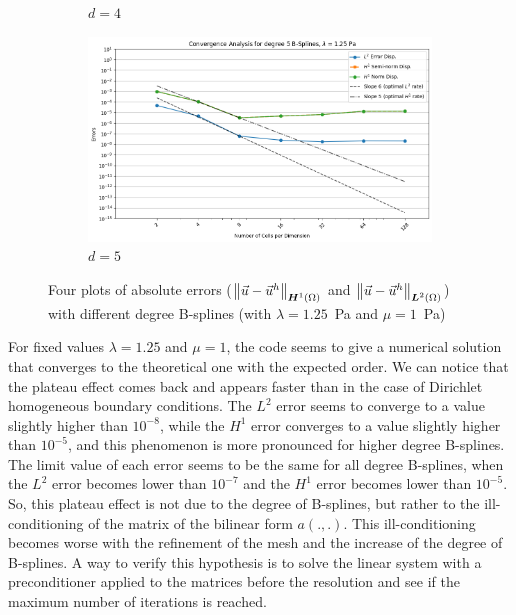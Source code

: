 \documentclass[a4paper,12pt,twoside]{report}
\begin{document}
\begin{figure}[!h]
\begin{subfigure}[b]{0.49\textwidth}
		\caption{$d=4$}
		\label{fig:deg4_NM}
	\end{subfigure}
	\begin{subfigure}[b]{0.49\textwidth}
		\centering
		\includegraphics[width=\textwidth]{figures/figures_non_mixed/convergence_plot_degree_5_lambda=1.25.png}
		\caption{$d=5$}
		\label{fig:deg5_NM}
	\end{subfigure}
	\caption{Four plots of absolute errors ($\norm{\vec u - \vec u^h}_{\boldsymbol H^1(\Omega)}$ and $\norm{\vec u - \vec u^h}_{\boldsymbol L^2(\Omega)}$) with different degree B-splines (with $\lambda = 1.25$~Pa and $\mu = 1$~Pa)}
	\label{fig:four_errors_graphs}
\end{figure}

For fixed values $\lambda = 1.25$ and $\mu = 1$, the code seems to give a numerical solution that converges to the theoretical one with the expected order. We can notice that the plateau effect comes back and appears faster than in the case of Dirichlet homogeneous boundary conditions. The $L^2$ error seems to converge to a value slightly higher than $10^{-8}$, while the $H^1$ error converges to a value slightly higher than $10^{-5}$, and this phenomenon is more pronounced for higher degree B-splines. The limit value of each error seems to be the same for all degree B-splines, when the $L^2$ error becomes lower than $10^{-7}$ and the $H^1$ error becomes lower than $10^{-5}$. So, this plateau effect is not due to the degree of B-splines, but rather to the ill-conditioning of the matrix of the bilinear form $a(.,.)$. This ill-conditioning becomes worse with the refinement of the mesh and the increase of the degree of B-splines. A way to verify this hypothesis is to solve the linear system with a preconditioner applied to the matrices before the resolution and see if the maximum number of iterations is reached.
\end{document}
